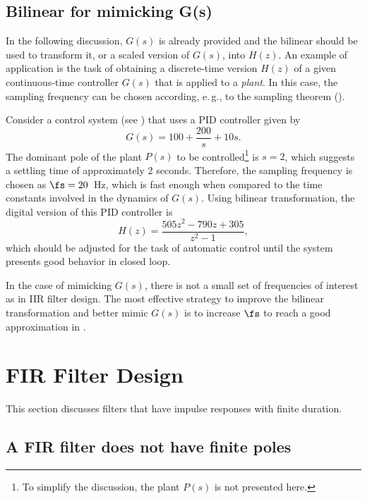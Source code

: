 \subsection{Bilinear for mimicking G(s)}
\label{sec:bilinearAdvanced}

In the following discussion, $G(s)$ is already provided and the bilinear should be used to transform
it, or a scaled version of $G(s)$, into $H(z)$. An example of application is
the task of obtaining a discrete-time version $H(z)$ of a given continuous-time controller $G(s)$ that is applied to a \emph{plant}. In this case, the sampling frequency can be chosen
according, e.\,g., to the sampling theorem ().

Consider a control system (see 
) that uses a PID
controller given by
\[
G(s) = 100 + \frac{200}{s} + 10s.
\]
The dominant pole of the plant $P(s)$ to be controlled\footnote{To simplify the discussion, the plant $P(s)$ is not presented here.} is $s=2$, which suggests a settling time of approximately 2 seconds.
Therefore, the sampling frequency is chosen as $\fs=20$~Hz, which is fast enough when compared to the time constants
involved in the dynamics of $G(s)$.
Using bilinear transformation, the digital version of this PID controller is
\[
H(z) = \frac{505 z^2 - 790 z + 305}{z^2 - 1},
\]
which should be adjusted for the task of automatic control until the system presents good behavior in closed loop.

In the case of mimicking $G(s)$, there is not a small set of frequencies of interest as in IIR filter design. The most effective strategy to 
improve the bilinear transformation and better mimic $G(s)$ is to increase $\fs$ to reach a good approximation in .

\section{FIR Filter Design}
\label{sec:firFilters}

This section discusses filters that have impulse responses with finite duration.

\subsection{A FIR filter does not have finite poles}

